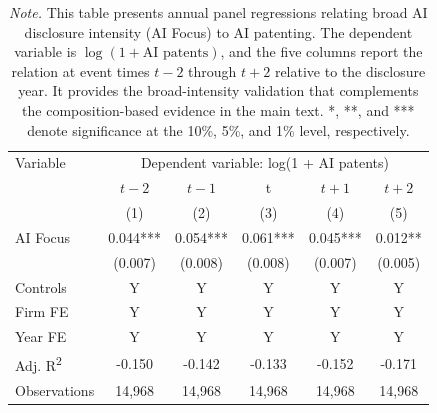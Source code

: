 \begin{table}[H]
\centering
\caption{AI disclosure intensity and AI patent timing}
\label{tab:appendix_aifocus_timing}
\footnotesize
\begin{tabular}{>{\raggedright\arraybackslash}p{}ccccc}
\hline
Variable & \multicolumn{5}{c}{Dependent variable: log(1 + AI patents)} \\
 & $t{-}2$ & $t{-}1$ & t & $t{+}1$ & $t{+}2$ \\
 & (1) & (2) & (3) & (4) & (5) \\
\hline
AI Focus & 0.044*** & 0.054*** & 0.061*** & 0.045*** & 0.012** \\
 & (0.007) & (0.008) & (0.008) & (0.007) & (0.005) \\
Controls & Y & Y & Y & Y & Y \\
Firm FE & Y & Y & Y & Y & Y \\
Year FE & Y & Y & Y & Y & Y \\
Adj. R\textsuperscript{2} & -0.150 & -0.142 & -0.133 & -0.152 & -0.171 \\
Observations & 14,968 & 14,968 & 14,968 & 14,968 & 14,968 \\
\hline
\end{tabular}%
\caption*{\footnotesize \textit{Note.} This table presents annual panel regressions relating broad AI disclosure intensity (AI Focus) to AI patenting. The dependent variable is $\log(1+\text{AI patents})$, and the five columns report the relation at event times $t-2$ through $t+2$ relative to the disclosure year. It provides the broad-intensity validation that complements the composition-based evidence in the main text. *, **, and *** denote significance at the 10\%, 5\%, and 1\% level, respectively.}
\end{table}

